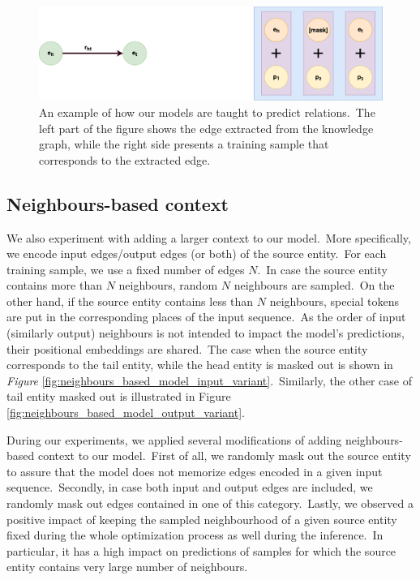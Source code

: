 \documentclass[longabstract, english, mgr]{iithesis}
\theoremstyle{default_theorem_style}\newtheorem{theorem}{Theorem}
\theoremstyle{default_theorem_style}\newtheorem{definition}{Definition}
\begin{document}
\begin{figure}[h!]
\centering
\includegraphics[scale=0.25]{relation_based_model}
\caption{An example of how our models are taught to predict relations.\ The left part of the figure shows the edge
extracted from the knowledge graph, while the right side presents a training sample that corresponds to the extracted
edge.}
\label{fig:relation_based_model}
\end{figure}

\subsection{Neighbours-based context}

We also experiment with adding a larger context to our model.\ More specifically, we encode input edges/output edges
(or both) of the source entity.\ For each training sample, we use a fixed number of edges $N$.\ In case the source
entity contains more than $N$ neighbours, random $N$ neighbours are sampled.\ On the other hand, if the source entity
contains less than $N$ neighbours, special tokens are put in the corresponding places of the input sequence.\ As the
order of input (similarly output) neighbours is not intended to impact the model's predictions, their positional
embeddings are shared.\ The case when the source entity corresponds to the tail entity, while the head entity is masked
out is shown in \textit{Figure} \ref{fig:neighbours_based_model_input_variant}.\ Similarly, the other case of tail
entity masked out is illustrated in Figure \ref{fig:neighbours_based_model_output_variant}.\newline

\noindent During our experiments, we applied several modifications of adding neighbours-based context to our
model.\ First of all, we randomly mask out the source entity to assure that the model does not memorize edges encoded
in a given input sequence.\ Secondly, in case both input and output edges are included, we randomly mask out edges
contained in one of this category.\ Lastly, we observed a positive impact of keeping the sampled neighbourhood of
a given source entity fixed during the whole optimization process as well during the inference.\ In particular, it
has a high impact on predictions of samples for which the source entity contains very large number of neighbours.
\end{document}
